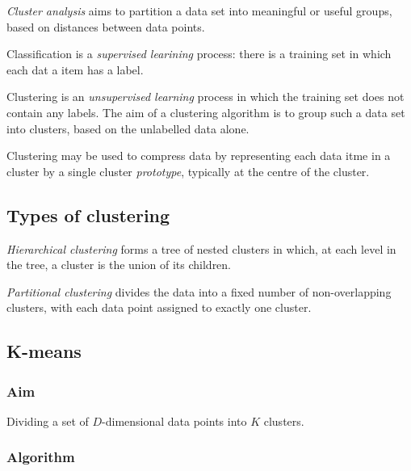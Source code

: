 \documentclass{article}
\begin{document}
\begin{definition}
	\emph{Cluster analysis} aims to partition a data set into meaningful or useful
	groups, based on distances between data points.
\end{definition}
\begin{definition}
	Classification is a \emph{supervised learining} process: there is a training
	set in which each dat a item has a label.
\end{definition}
\begin{definition}
	Clustering is an \emph{unsupervised learning} process in which the training
	set does not contain any labels. The aim of a clustering algorithm is to group
	such a data set into clusters, based on the unlabelled data alone.
\end{definition}
\begin{definition}
	Clustering may be used to compress data by representing each data itme
	in a cluster by a single cluster \emph{prototype}, typically at the centre
	of the cluster.
\end{definition}

\subsection{Types of clustering}

\begin{definition}
	\emph{Hierarchical clustering} forms a tree of nested clusters in which, at
	each level in the tree, a cluster is the union of its children.
\end{definition}
\begin{definition}
	\emph{Partitional clustering} divides the data into a fixed number of
	non-overlapping clusters, with each data point assigned to exactly one
	cluster.
\end{definition}

\subsection{K-means}

\subsubsection{Aim}

Dividing a set of $D$-dimensional data points into $K$ clusters.

\subsubsection{Algorithm}
\end{document}

